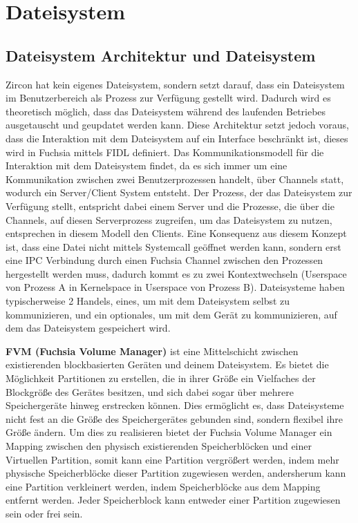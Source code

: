 \documentclass[a4paper]{scrartcl}
\begin{document}
\section{Dateisystem}
\label{sec:Dateisystem}
\subsection{Dateisystem Architektur und Dateisystem}
Zircon hat kein eigenes Dateisystem, sondern setzt darauf, dass ein Dateisystem im Benutzerbereich als Prozess zur Verfügung gestellt wird. Dadurch wird es theoretisch möglich, dass das Dateisystem während des laufenden Betriebes ausgetauscht und geupdatet werden kann. Diese Architektur setzt jedoch voraus, dass die Interaktion mit dem Dateisystem auf ein Interface beschränkt ist, dieses wird in Fuchsia mittels FIDL \cite{vglFIDLio} definiert. Das Kommunikationsmodell für die Interaktion mit dem Dateisystem findet, da es sich immer um eine Kommunikation zwischen zwei Benutzerprozessen handelt, über Channels statt, wodurch ein Server/Client System entsteht. Der Prozess, der das Dateisystem zur Verfügung stellt, entspricht dabei einem Server und die Prozesse, die über die Channels, auf diesen Serverprozess zugreifen, um das Dateisystem zu nutzen, entsprechen in diesem Modell den Clients. Eine Konsequenz aus diesem Konzept ist, dass eine Datei nicht mittels Systemcall geöffnet werden kann, sondern erst eine IPC Verbindung durch einen Fuchsia Channel \cite{https://fuchsia.dev/fuchsia-src/reference/kernel_objects/channel} zwischen den Prozessen hergestellt werden muss, dadurch kommt es zu zwei Kontextwechseln (Userspace von Prozess A in Kernelspace in Userspace von Prozess B). Dateisysteme haben typischerweise 2 Handels, eines, um mit dem Dateisystem selbst zu kommunizieren, und ein optionales, um mit dem Gerät zu kommunizieren, auf dem das Dateisystem gespeichert wird.

\textbf{FVM (Fuchsia Volume Manager)} ist eine Mittelschicht zwischen existierenden blockbasierten Geräten und deinem Dateisystem. Es bietet die Möglichkeit Partitionen zu erstellen, die in ihrer Größe ein Vielfaches der Blockgröße des Gerätes besitzen, und sich dabei sogar über mehrere Speichergeräte hinweg erstrecken können. Dies ermöglicht es, dass Dateisysteme nicht fest an die Größe des Speichergerätes gebunden sind, sondern flexibel ihre Größe ändern. Um dies zu realisieren bietet der Fuchsia Volume Manager ein Mapping zwischen den physisch existierenden Speicherblöcken und einer Virtuellen Partition, somit kann eine Partition vergrößert werden, indem mehr physische Speicherblöcke dieser Partition zugewiesen werden, andersherum kann eine Partition verkleinert werden, indem Speicherblöcke aus dem Mapping entfernt werden. Jeder Speicherblock kann entweder einer Partition zugewiesen sein oder frei sein.
\end{document}
